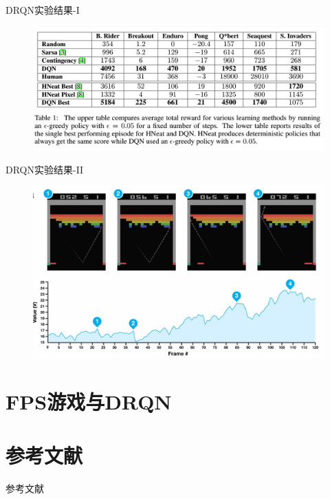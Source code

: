 \documentclass[10pt]{beamer}
\begin{document}
	\begin{frame}{DRQN}{实验结果-I}
		\begin{figure}
			\centering
			\includegraphics[width=0.7\linewidth]{pictures/drqn-expr-result-tab}
			\caption{}
			\label{fig:drqn-expr-result-tab}
		\end{figure}	
	\end{frame}

	\begin{frame}{DRQN}{实验结果-II}
		\begin{figure}
			\centering
			\includegraphics[width=0.7\linewidth]{pictures/drqn-expr-result-chart}
			\caption{}
			\label{fig:drqn-expr-result-chart}
		\end{figure}
		
	\end{frame}
	
	\section{FPS游戏与DRQN}
	
	\section*{参考文献}
	
	\begin{frame}{参考文献}
		
		
	\end{frame}
	
	{\background%
		\begin{frame}
		\end{frame}
	}
	
\end{document}
